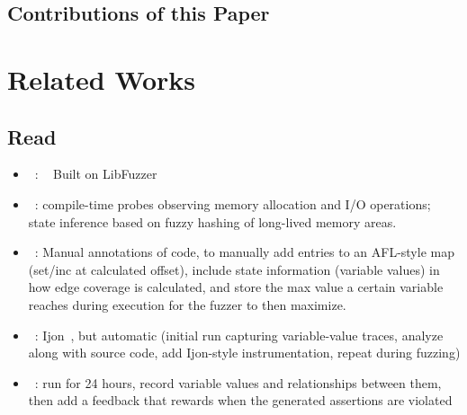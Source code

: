 \documentclass{article}
\let\savedCite=\cite
\renewcommand{\cite}{\unskip~\savedCite}
\begin{document}
\begin{multicols}{2}
  \subsection{Contributions of this Paper}

  \section{Related Works}
  \subsection{Read}
  \begin{itemize}
    \item {}\cite{StatefulGreybox}: \cite{StatefulGreybox} Built on LibFuzzer
    \item {}\cite{StateAFL}: compile-time probes observing memory allocation and I/O operations; state inference based on fuzzy hashing of long-lived memory areas.
    \item {}\cite{Ijon}: Manual annotations of code, to manually add entries to an AFL-style map (set/inc at calculated offset), include state information (variable values) in how edge coverage is calculated, and store the max value a certain variable reaches during execution for the fuzzer to then maximize.
    \item {}\cite{SandPuppy}: Ijon\cite{Ijon}, but automatic (initial run capturing variable-value traces, analyze along with source code, add Ijon-style instrumentation, repeat during fuzzing)
    \item {}\cite{INVSCOV}: run for 24 hours, record variable values and relationships between them, then add a feedback that rewards when the generated assertions are violated

\end{itemize}
\end{multicols}
\end{document}
